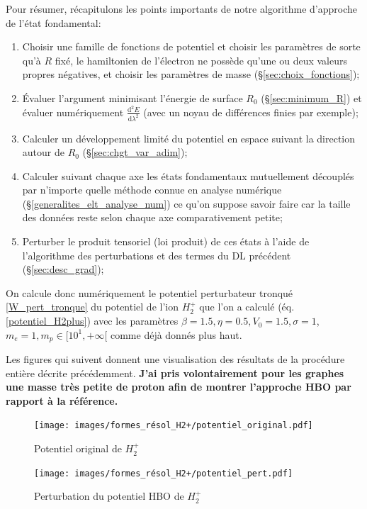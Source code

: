 \documentclass[svgnames,dvipsnames,a4paper,10pt,french]{report}
\begin{document}
Pour résumer, récapitulons les points importants de notre algorithme d'approche de l'état fondamental:
\begin{enumerate}
    \item Choisir une famille de  fonctions de potentiel et choisir les paramètres de sorte qu'à $R$ fixé, le hamiltonien de l'électron ne possède qu'une ou deux valeurs propres négatives, et choisir les paramètres de masse (\S\ref{sec:choix_fonctions});
    \item Évaluer l'argument minimisant l'énergie de surface $R_0$ (\S\ref{sec:minimum_R}) et évaluer numériquement $\frac{\mathrm{d}^2E}{\mathrm{d}\lambda^2}$ (avec un noyau de différences finies par exemple);
    \item Calculer un développement limité du potentiel en espace suivant la direction autour de $R_0$  (\S\ref{sec:chgt_var_adim});
    \item Calculer suivant chaque axe les états fondamentaux mutuellement découplés par n'importe quelle méthode connue en analyse numérique (\S \ref{generalites_elt_analyse_num}) ce qu'on suppose savoir faire car la taille des données reste selon chaque axe comparativement petite;
    \item Perturber le produit tensoriel (loi produit) de ces états à l'aide de l'algorithme des perturbations et des termes du DL précédent (\S\ref{sec:desc_grad});
\end{enumerate}


On calcule donc numériquement le potentiel perturbateur tronqué \ref{W_pert_tronque} du potentiel de l'ion $H_2^+$ que l'on a calculé (éq.  \ref{potentiel_H2plus}) avec les paramètres $\beta=1.5, \eta=0.5, V_0 = 1.5, \sigma = 1$, $m_e = 1, m_p \in [10^1,+\infty[$ comme déjà donnés plus haut.

Les figures qui suivent donnent une visualisation des résultats de la procédure entière décrite précédemment. \textbf{J'ai pris volontairement pour les graphes une masse très petite de proton afin de montrer l'approche HBO par rapport à la référence.}

\begin{figure}[H]
    \centering
    \texttt{[image: images/formes\_résol\_H2+/potentiel\_original.pdf]}
    \caption{Potentiel original de $H_2^+$}
    \label{fig:pot_orig_h2plus}
\end{figure}


\begin{figure}[H]
    \centering
    \texttt{[image: images/formes\_résol\_H2+/potentiel\_pert.pdf]}
    \caption{Perturbation du potentiel HBO de $H_2^+$}
    \label{fig:pert_hbo_h2plus}
\end{figure}
\end{document}
